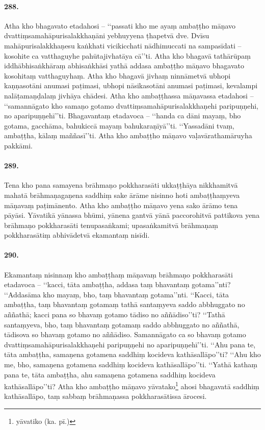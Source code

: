 \paragraph{288.} Atha kho bhagavato etadahosi – ‘‘passati kho me ayaṃ ambaṭṭho māṇavo dvattiṃsamahāpurisalakkhaṇāni yebhuyyena ṭhapetvā dve. Dvīsu mahāpurisalakkhaṇesu kaṅkhati vicikicchati nādhimuccati na sampasīdati – kosohite ca vatthaguyhe pahūtajivhatāya cā’’ti. Atha kho bhagavā tathārūpaṃ iddhābhisaṅkhāraṃ abhisaṅkhāsi yathā addasa ambaṭṭho māṇavo bhagavato kosohitaṃ vatthaguyhaṃ. Atha kho bhagavā jivhaṃ ninnāmetvā ubhopi kaṇṇasotāni anumasi paṭimasi, ubhopi nāsikasotāni anumasi paṭimasi, kevalampi nalāṭamaṇḍalaṃ jivhāya chādesi. Atha kho ambaṭṭhassa māṇavassa etadahosi – ‘‘samannāgato kho samaṇo gotamo dvattiṃsamahāpurisalakkhaṇehi paripuṇṇehi, no aparipuṇṇehī’’ti. Bhagavantaṃ etadavoca – ‘‘handa ca dāni mayaṃ, bho gotama, gacchāma, bahukiccā mayaṃ bahukaraṇīyā’’ti. ‘‘Yassadāni tvaṃ, ambaṭṭha, kālaṃ maññasī’’ti. Atha kho ambaṭṭho māṇavo vaḷavārathamāruyha pakkāmi.

\paragraph{289.} Tena kho pana samayena brāhmaṇo pokkharasāti ukkaṭṭhāya nikkhamitvā mahatā brāhmaṇagaṇena saddhiṃ sake ārāme nisinno hoti ambaṭṭhaṃyeva māṇavaṃ paṭimānento. Atha kho ambaṭṭho māṇavo yena sako ārāmo tena pāyāsi. Yāvatikā yānassa bhūmi, yānena gantvā yānā paccorohitvā pattikova yena brāhmaṇo pokkharasāti tenupasaṅkami; upasaṅkamitvā brāhmaṇaṃ pokkharasātiṃ abhivādetvā ekamantaṃ nisīdi.

\paragraph{290.} Ekamantaṃ nisinnaṃ kho ambaṭṭhaṃ māṇavaṃ brāhmaṇo pokkharasāti etadavoca – ‘‘kacci, tāta ambaṭṭha, addasa taṃ bhavantaṃ gotama’’nti? ‘‘Addasāma kho mayaṃ, bho, taṃ bhavantaṃ gotama’’nti. ‘‘Kacci, tāta ambaṭṭha, taṃ bhavantaṃ gotamaṃ tathā santaṃyeva saddo abbhuggato no aññathā; kacci pana so bhavaṃ gotamo tādiso no aññādiso’’ti? ‘‘Tathā santaṃyeva, bho, taṃ bhavantaṃ gotamaṃ saddo abbhuggato no aññathā, tādisova so bhavaṃ gotamo no aññādiso. Samannāgato ca so bhavaṃ gotamo dvattiṃsamahāpurisalakkhaṇehi paripuṇṇehi no aparipuṇṇehī’’ti. ‘‘Ahu pana te, tāta ambaṭṭha, samaṇena gotamena saddhiṃ kocideva kathāsallāpo’’ti? ‘‘Ahu kho me, bho, samaṇena gotamena saddhiṃ kocideva kathāsallāpo’’ti. ‘‘Yathā kathaṃ pana te, tāta ambaṭṭha, ahu samaṇena gotamena saddhiṃ kocideva kathāsallāpo’’ti? Atha kho ambaṭṭho māṇavo yāvatako\footnote{yāvatiko (ka. pī.)} ahosi bhagavatā saddhiṃ kathāsallāpo, taṃ sabbaṃ brāhmaṇassa pokkharasātissa ārocesi.

